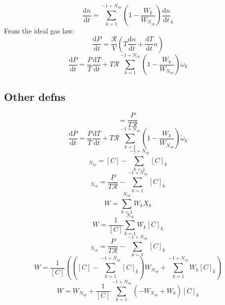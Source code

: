 \documentclass[a4paper,10pt]{article}
\newcommand{\ns}{N_{sp}}
\newcommand{\Ru}{\mathcal{R}}
\begin{document}
\begin{dmath} \frac{\text{d} n }{\text{d} t } = \sum_{k=1}^{-1 + \ns} \left(1 - \frac{W_{k}}{W_{\ns}}\right) \frac{\text{d} n }{\text{d} t }_{k}\end{dmath} 
From the ideal gas law:
\begin{dmath} \frac{\text{d} P }{\text{d} t } = \frac{\Ru}{V} \left(T \frac{\text{d} n }{\text{d} t } + \frac{\text{d} T }{\text{d} t } n\right)\end{dmath} 
\begin{dmath} \frac{\text{d} P }{\text{d} t } = \frac{P}{T} \frac{\text{d} T }{\text{d} t } + T \Ru \sum_{k=1}^{-1 + \ns} \left(1 - \frac{W_{k}}{W_{\ns}}\right) \dot{\omega}_{k}\end{dmath} 
\subsection{Other defns}
\begin{dmath} [C] = \frac{P}{T \Ru}\end{dmath} 
\begin{dmath} \frac{\text{d} P }{\text{d} t } = \frac{P}{T} \frac{\text{d} T }{\text{d} t } + T \Ru \sum_{k=1}^{-1 + \ns} \left(1 - \frac{W_{k}}{W_{\ns}}\right) \dot{\omega}_{k}\end{dmath} 
\begin{dmath} [C]_{\ns} = [C] - \sum_{k=1}^{-1 + \ns} [C]_{k}\end{dmath} 
\begin{dmath} [C]_{\ns} = \frac{P}{T \Ru} - \sum_{k=1}^{-1 + \ns} [C]_{k}\end{dmath} 
\begin{dmath} W = \sum_{k=1}^{\ns} W_{k} X_{k}\end{dmath} 
\begin{dmath} W = \frac{1}{[C]} \sum_{k=1}^{\ns} W_{k} [C]_{k}\end{dmath} 
\begin{dmath} [C]_{\ns} = \frac{P}{T \Ru} - \sum_{k=1}^{-1 + \ns} [C]_{k}\end{dmath} 
\begin{dmath} W = \frac{1}{[C]} \left(\left([C] - \sum_{k=1}^{-1 + \ns} [C]_{k}\right) W_{\ns} + \sum_{k=1}^{-1 + \ns} W_{k} [C]_{k}\right)\end{dmath} 
\begin{dmath} W = W_{\ns} + \frac{1}{[C]} \sum_{k=1}^{-1 + \ns} \left(- W_{\ns} + W_{k}\right) [C]_{k}\end{dmath} 
\end{document}
